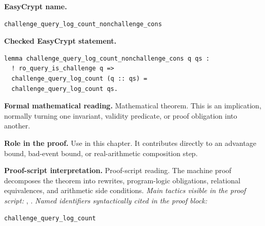 \begin{formaltheorem}
\noindent\textbf{EasyCrypt name.}
\begin{lstlisting}[language=EasyCrypt,basicstyle=\ttfamily\scriptsize]
challenge_query_log_count_nonchallenge_cons
\end{lstlisting}
\noindent\textbf{Checked EasyCrypt statement.}
\begin{lstlisting}[language=EasyCrypt,basicstyle=\ttfamily\scriptsize]
lemma challenge_query_log_count_nonchallenge_cons q qs :
  ! ro_query_is_challenge q =>
  challenge_query_log_count (q :: qs) =
  challenge_query_log_count qs.
\end{lstlisting}
\noindent\textbf{Formal mathematical reading.}
Mathematical theorem. This is an implication, normally turning one invariant, validity predicate, or proof obligation into another.

\noindent\textbf{Role in the proof.}
Use in this chapter. It contributes directly to an advantage bound, bad-event bound, or real-arithmetic composition step.

\noindent\textbf{Proof-script interpretation.}
Proof-script reading. The machine proof decomposes the theorem into rewrites, program-logic obligations, relational equivalences, and arithmetic side conditions.
\emph{Main tactics visible in the proof script:} , .
\emph{Named identifiers syntactically cited in the proof block:}
\begin{lstlisting}[language=EasyCrypt,basicstyle=\ttfamily\scriptsize]
challenge_query_log_count
\end{lstlisting}

\end{formaltheorem}

